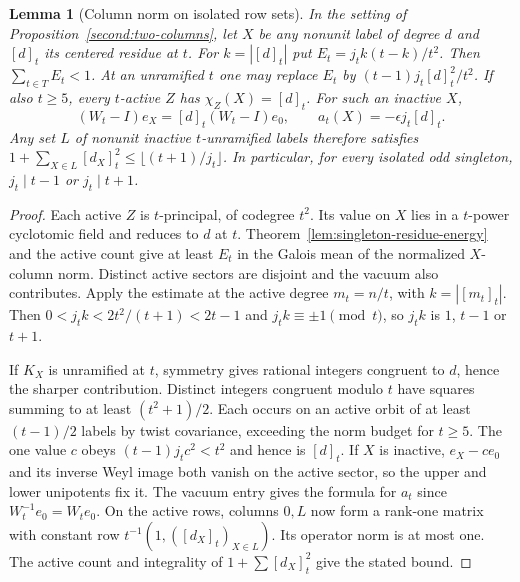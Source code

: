 \documentclass[11pt,a4paper]{article}
\numberwithin{equation}{section}
\newtheorem{lemma}[theorem]{Lemma}
\theoremstyle{remark}
\begin{document}
\begin{lemma}[Column norm on isolated row sets]\label{fam:M:6.5}\label{lem:singleton-energy}\label{lem:local-integer-column}\label{new:rank-budget}
In the setting of Proposition~\ref{second:two-columns}, let
$X$ be any nonunit label of degree $d$ and $[d]_t$ its centered
residue at $t$. For $k=|[d]_t|$ put $E_t=j_tk(t-k)/t^2$.
Then $\sum_{t\in T}E_t<1$. At an unramified $t$ one may replace
$E_t$ by $(t-1)j_t[d]_t^2/t^2$. If also $t\ge5$, every $t$-active
$Z$ has $\chi_Z(X)=[d]_t$. For such an inactive $X$,
\[
   (W_t-I)e_X=[d]_t(W_t-I)e_0,\qquad a_t(X)=-\epsilon j_t[d]_t .
\]
Any set $L$ of nonunit inactive $t$-unramified labels therefore satisfies
$1+\sum_{X\in L}[d_X]_t^2\le\lfloor(t+1)/j_t\rfloor$.
In particular, for every isolated odd singleton, $j_t\mid t-1$ or
$j_t\mid t+1$.
\end{lemma}
\begin{proof}
Each active $Z$ is $t$-principal, of codegree $t^2$. Its value on
$X$ lies in a $t$-power cyclotomic field and reduces to $d$ at $t$.
Theorem~\ref{lem:singleton-residue-energy} and the active count give
at least $E_t$ in the Galois mean of the normalized $X$-column norm.
Distinct active sectors are disjoint and the vacuum also contributes.
Apply the estimate at the active degree $m_t=n/t$, with
$k=|[m_t]_t|$. Then $0<j_tk<2t^2/(t+1)<2t-1$ and
$j_tk\equiv\pm1\pmod t$, so $j_tk$ is $1$, $t-1$ or $t+1$.

If $K_X$ is unramified at $t$, symmetry gives rational integers
congruent to $d$, hence the sharper contribution. Distinct integers congruent modulo $t$ have squares summing
to at least $(t^2+1)/2$. Each occurs on an active orbit of at least
$(t-1)/2$ labels by twist covariance, exceeding the norm budget for
$t\ge5$. The one value $c$ obeys $(t-1)j_tc^2<t^2$ and hence is
$[d]_t$. If $X$ is inactive, $e_X-ce_0$ and its inverse Weyl image
both vanish on the active sector, so the upper and lower unipotents
fix it. The vacuum entry gives the formula for $a_t$ since
$W_t^{-1}e_0=W_te_0$. On the active rows, columns $0,L$ now form
a rank-one matrix with constant row $t^{-1}(1,([d_X]_t)_{X\in L})$.
Its operator norm is at most one. The active count and integrality
of $1+\sum[d_X]_t^2$ give the stated bound.
\end{proof}
\end{document}
